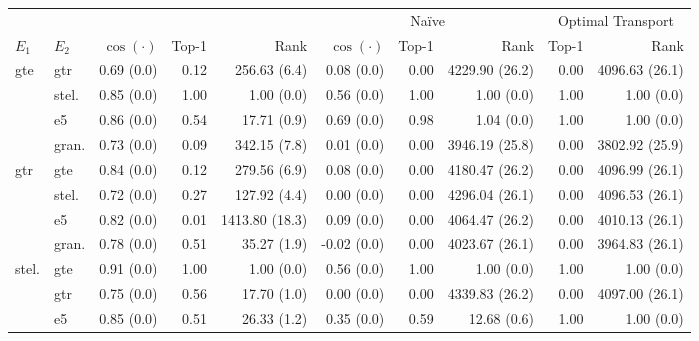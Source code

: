 \begin{table}[!ht]
    \scriptsize
    \centering
    \begin{tabular}{llrrrrrrrr}
        \toprule
        \multicolumn{2}{c}{} & \multicolumn{3}{c}{\atk{}} & \multicolumn{3}{c}{Naïve} & \multicolumn{2}{c}{Optimal Transport}\\
        \cmidrule(lr){3-5} \cmidrule(lr){6-8}  \cmidrule(lr){9-10} 
        $E_1$ & $E_2$ & $\cos(\cdot)$ & Top-1 & Rank & $\cos(\cdot)$ & Top-1 & Rank & Top-1 & Rank\\
        \midrule
        \multirow{4}{*}{gte} & gtr & 0.69 {\tiny (0.0)} & 0.12 & 256.63 {\tiny (6.4)} & 0.08 {\tiny (0.0)} & 0.00 & 4229.90 {\tiny (26.2)} & 0.00 & 4096.63 {\tiny (26.1)} \\
        & stel. & 0.85 {\tiny (0.0)} & 1.00 & 1.00 {\tiny (0.0)} & 0.56 {\tiny (0.0)} & 1.00 & 1.00 {\tiny (0.0)} & 1.00 & 1.00 {\tiny (0.0)} \\
        & e5 & 0.86 {\tiny (0.0)} & 0.54 & 17.71 {\tiny (0.9)} & 0.69 {\tiny (0.0)} & 0.98 & 1.04 {\tiny (0.0)} & 1.00 & 1.00 {\tiny (0.0)} \\
        & gran. & 0.73 {\tiny (0.0)} & 0.09 & 342.15 {\tiny (7.8)} & 0.01 {\tiny (0.0)} & 0.00 & 3946.19 {\tiny (25.8)} & 0.00 & 3802.92 {\tiny (25.9)} \\
        \midrule
        \multirow{4}{*}{gtr} & gte & 0.84 {\tiny (0.0)} & 0.12 & 279.56 {\tiny (6.9)} & 0.08 {\tiny (0.0)} & 0.00 & 4180.47 {\tiny (26.2)} & 0.00 & 4096.99 {\tiny (26.1)} \\
        & stel. & 0.72 {\tiny (0.0)} & 0.27 & 127.92 {\tiny (4.4)} & 0.00 {\tiny (0.0)} & 0.00 & 4296.04 {\tiny (26.1)} & 0.00 & 4096.53 {\tiny (26.1)} \\
        & e5 & 0.82 {\tiny (0.0)} & 0.01 & 1413.80 {\tiny (18.3)} & 0.09 {\tiny (0.0)} & 0.00 & 4064.47 {\tiny (26.2)} & 0.00 & 4010.13 {\tiny (26.1)} \\
        & gran. & 0.78 {\tiny (0.0)} & 0.51 & 35.27 {\tiny (1.9)} & -0.02 {\tiny (0.0)} & 0.00 & 4023.67 {\tiny (26.1)} & 0.00 & 3964.83 {\tiny (26.1)} \\
        \midrule
        \multirow{4}{*}{stel.} & gte & 0.91 {\tiny (0.0)} & 1.00 & 1.00 {\tiny (0.0)} & 0.56 {\tiny (0.0)} & 1.00 & 1.00 {\tiny (0.0)} & 1.00 & 1.00 {\tiny (0.0)} \\
        & gtr & 0.75 {\tiny (0.0)} & 0.56 & 17.70 {\tiny (1.0)} & 0.00 {\tiny (0.0)} & 0.00 & 4339.83 {\tiny (26.2)} & 0.00 & 4097.00 {\tiny (26.1)} \\
        & e5 & 0.85 {\tiny (0.0)} & 0.51 & 26.33 {\tiny (1.2)} & 0.35 {\tiny (0.0)} & 0.59 & 12.68 {\tiny (0.6)} & 1.00 & 1.00 {\tiny (0.0)} \\

\end{tabular}
\end{table}
